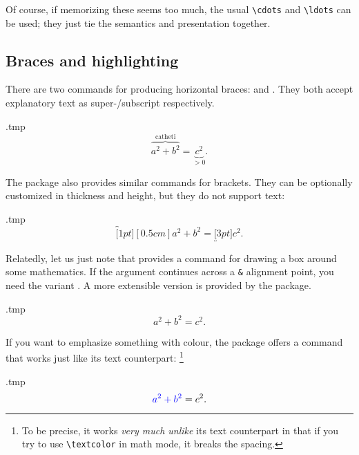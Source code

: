 Of course, if memorizing these seems too much, the usual \verb|\cdots| and \verb|\ldots| can be used;
they just tie the semantics and presentation together.


%
%
\subsection{Braces and highlighting}
There are two commands for producing horizontal braces:
 and .
They both accept explanatory text as super-/subscript respectively.
%
\begin{VerbatimOut}{\jobname.tmp}
\[
\overbrace{a^2 + b^2}^{\text{catheti}}
= \underbrace{c^2}_{> 0}.
\]
\end{VerbatimOut}
\ShowExample

The  package also provides similar commands for brackets.
They can be optionally customized in thickness and height,
but they do not support text:
%
\begin{VerbatimOut}{\jobname.tmp}
\[
\overbracket[1pt][0.5cm]{a^2 + b^2}
= \underbracket[3pt]{c^2}.
\]
\end{VerbatimOut}
\ShowExample

Relatedly, let us just note that  provides a  command
for drawing a box around some mathematics.
If the argument continues across a \verb|&| alignment point,
you need the  variant .
A more extensible version is provided by the  package.
%
\begin{VerbatimOut}{\jobname.tmp}
\[
\boxed{a^2 + b^2} = c^2.
\]
\end{VerbatimOut}
\ShowExample

If you want to emphasize something with colour,
the  package offers a  command that works
just like its text counterpart:%
\footnote{To be precise, it works \emph{very much unlike} its text counterpart in that
if you try to use \texttt{\textbackslash textcolor} in math mode, it breaks the spacing.}
%
\begin{VerbatimOut}{\jobname.tmp}
\[
\mathcolor{blue}{a^2 + b^2} = c^2.
\]
\end{VerbatimOut}
\ShowExample


%
%
